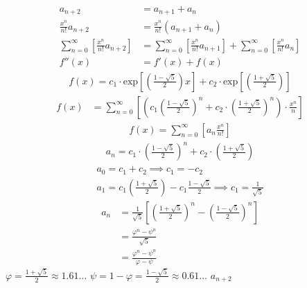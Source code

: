\documentclass{article}
\begin{document}
\begin{align*}
a_{n+  2}    &= a_{n+  1} +  a_{n}\\
\frac{x^n}{n!}   a_{n+  2}    &= \frac{x^n}{n!}\left( a_{n+  1} +  a_{n}  \right)\\
\sum^{\infty}_{n= 0} \left[ \frac{x^n}{n!}   a_{n+  2} \right]        &= \sum^{\infty}_{n= 0}   \left[ \frac{x^n}{n!} a_{n+  1} \right]  + \sum^{\infty}_{n= 0}   \left[ \frac{x^n}{n!} a_{n}  \right]  \\
f''\left( x \right) &= f'\left( x \right)+  f\left( x \right)
\end{align*}
\begin{align*}
f\left( x \right)= c_1 \cdot  \mathrm{exp}\left[ \left( \frac{1- \sqrt{5} }{2} \right)x \right] +  c_2 \cdot  \mathrm{exp}\left[ \left( \frac{1 +  \sqrt{5} }{2} \right) \right]
\end{align*}
\begin{align*}
f\left( x \right)&= \sum^{\infty}_{n= 0}   \left[ \left( c_1\left( \frac{1- \sqrt{5} }{2} \right)^n +  c_2 \cdot  \left( \frac{1+ \sqrt{5} }{2} \right)^n \right) \cdot  \frac{x^n}{n} \right]
\end{align*}
\begin{align*}
f\left( x \right)= \sum^{\infty}_{n= 0}   \left[ a_n \frac{x^n}{n!} \right]
\end{align*}
\begin{align*}
a_n = c_1\cdot  \left( \frac{1- \sqrt{5} }{2} \right)^n +  c_2 \cdot  \left( \frac{1+  \sqrt{5} }{2} \right)
\end{align*}
\begin{align*}
a_0= c_1 +  c_2  \implies  c_1= - c_2\\
a_1= c_1 \left( \frac{1+ \sqrt{5} }{2} \right) -  c_1 \frac{1-\sqrt{5} }{2}  \implies  c_1 = \frac{1}{\sqrt{5} }
\end{align*}
\begin{align*}
    a_n &= \frac{1}{\sqrt{5} } \left[ \left( \frac{1+  \sqrt{5} }{2}  \right)^n -  \left( \frac{1- \sqrt{5} }{2} \right)^n \right] \\
&= \frac{\varphi^n - \psi^n}{\sqrt{5} } \\
&= \frac{\varphi^n -  \psi^n}{\varphi - \psi}
\end{align*}
$\varphi = \frac{1+ \sqrt{5} }{2} \approx 1.61\ldots$
$\psi = 1-\varphi = \frac{1- \sqrt{5} }{2} \approx 0.61\ldots$
$a_{n+ 2}$
\end{document}
